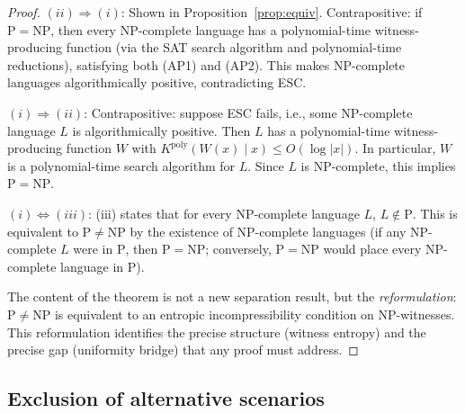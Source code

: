 \documentclass[aps,prd,twocolumn,superscriptaddress,nofootinbib]{revtex4-2}
\theoremstyle{definition}
\theoremstyle{remark}
\DeclareMathOperator{\poly}{poly}
\newcommand{\NP}{\mathrm{NP}}
\newcommand{\PP}{\mathrm{P}}
\begin{document}
\begin{proof}
$(ii) \Rightarrow (i)$: Shown in Proposition~\ref{prop:equiv}. Contrapositive: if $\PP = \NP$, then every NP-complete language has a polynomial-time witness-producing function (via the SAT search algorithm and polynomial-time reductions), satisfying both (AP1) and (AP2). This makes NP-complete languages algorithmically positive, contradicting ESC.

$(i) \Rightarrow (ii)$: Contrapositive: suppose ESC fails, i.e., some NP-complete language $L$ is algorithmically positive. Then $L$ has a polynomial-time witness-producing function $W$ with $K^{\poly}(W(x) \mid x) \leq O(\log|x|)$. In particular, $W$ is a polynomial-time search algorithm for $L$. Since $L$ is NP-complete, this implies $\PP = \NP$.

$(i) \Leftrightarrow (iii)$: (iii) states that for every NP-complete language $L$, $L \notin \PP$. This is equivalent to $\PP \neq \NP$ by the existence of NP-complete languages (if any NP-complete $L$ were in $\PP$, then $\PP = \NP$; conversely, $\PP = \NP$ would place every NP-complete language in $\PP$).

The content of the theorem is not a new separation result, but the \textit{reformulation}: $\PP \neq \NP$ is equivalent to an entropic incompressibility condition on NP-witnesses. This reformulation identifies the precise structure (witness entropy) and the precise gap (uniformity bridge) that any proof must address.
\end{proof}

\subsection{Exclusion of alternative scenarios}
\end{document}
